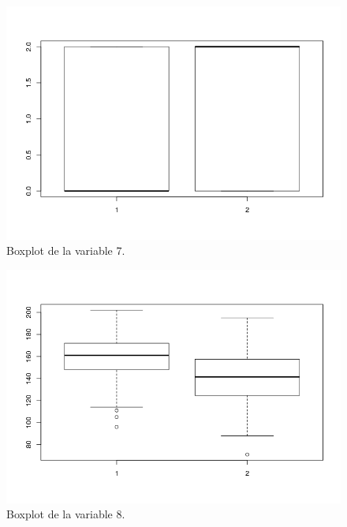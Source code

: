 \documentclass[12pt,a4paper]{article}
\begin{document}
\begin{figure}[H]
	\centering
	\includegraphics[scale=0.6]{./Imagenes/EDA/Clasificacion/boxplot_variable7.png}
	\caption{Boxplot de la variable 7.}
\end{figure}

\begin{figure}[H]
	\centering
	\includegraphics[scale=0.6]{./Imagenes/EDA/Clasificacion/boxplot_variable8.png}
	\caption{Boxplot de la variable 8.}
\end{figure}
\end{document}
